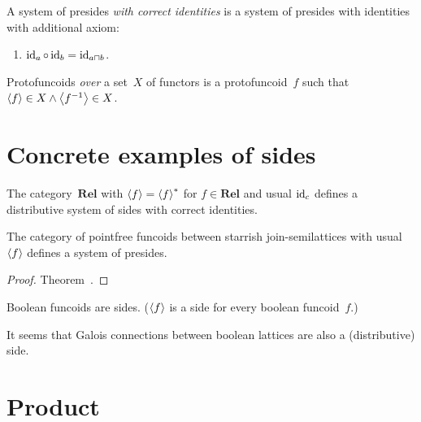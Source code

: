\begin{defn}
A system of presides \emph{with correct identities} is a system of presides with identities with additional axiom:
\begin{enumerate}
\item $\operatorname{id}_a\circ\operatorname{id}_b = \operatorname{id}_{a\sqcap b}$.
\end{enumerate}
\end{defn}

\begin{defn}
Protofuncoids \emph{over} a set~$X$ of functors is a protofuncoid~$f$
such that $\left\langle f\right\rangle\in X\land\left\langle f^{-1}\right\rangle\in X$.
\end{defn}

\section{Concrete examples of sides}

\begin{obvious}
The category~$\mathbf{Rel}$ with $\left\langle f\right\rangle=\left\langle f\right\rangle ^{\ast}$ for $f\in\mathbf{Rel}$ and usual $\operatorname{id}_c$ defines a distributive system of sides with correct identities.
\end{obvious}

\begin{prop}
The category of pointfree funcoids between starrish join-semilattices with usual~$\left\langle f\right\rangle$ defines a system of presides.
\end{prop}

\begin{proof}
Theorem~.
\end{proof}

Boolean funcoids  are sides.
($\left\langle f\right\rangle$ is a side for every boolean funcoid~$f$.)

It seems  that Galois connections between boolean lattices 
are also a (distributive) side.



\section{Product}

